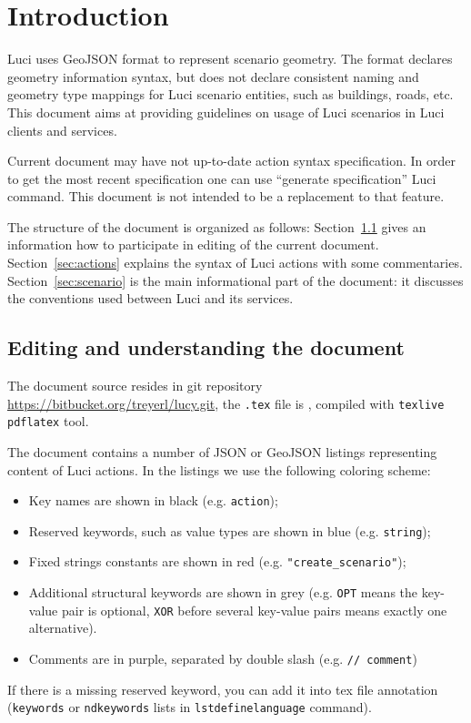 \section{Introduction}

\ac{Luci} uses GeoJSON format to represent scenario geometry.
The format declares geometry information syntax, but does not declare consistent naming and geometry type mappings for \ac{Luci} scenario entities, such as buildings, roads, etc.
This document aims at providing guidelines on usage of \ac{Luci} scenarios in \ac{Luci} clients and services.

Current document may have not up-to-date action syntax specification.
In order to get the most recent specification one can use ``generate specification'' \ac{Luci} command.
This document is not intended to be a replacement to that feature.

The structure of the document is organized as follows:
Section~\ref{sec:editing} gives an information how to participate in editing of the current document.
Section~\ref{sec:actions} explains the syntax of \ac{Luci} actions with some commentaries.
Section~\ref{sec:scenario} is the main informational part of the document: it discusses the conventions used between \ac{Luci} and its services.

\subsection{Editing and understanding the document}
\label{sec:editing}

The document source resides in git repository \url{https://bitbucket.org/treyerl/lucy.git},
the \texttt{.tex} file is , compiled with \texttt{texlive} \texttt{pdflatex} tool.

The document contains a number of JSON or GeoJSON listings representing content of \ac{Luci} actions.
In the listings we use the following coloring scheme:
%
\begin{itemize}
\item Key names are shown in black (e.g. \texttt{action});
\item Reserved keywords, such as value types are shown in blue (e.g. \texttt{\color{blue}string});
\item Fixed strings constants are shown in red (e.g. \texttt{\color{red}"create\_scenario"});
\item Additional structural keywords are shown in grey
(e.g. \texttt{\color{darkgray}OPT} means the key-value pair is optional, \texttt{\color{darkgray}XOR} before several key-value pairs means exactly one alternative).
\item Comments are in purple, separated by double slash (e.g. \texttt{\color{purple}// comment})
\end{itemize}
%
If there is a missing reserved keyword, you can add it into tex file annotation (\texttt{keywords} or \texttt{ndkeywords} lists in \texttt{lstdefinelanguage} command).

